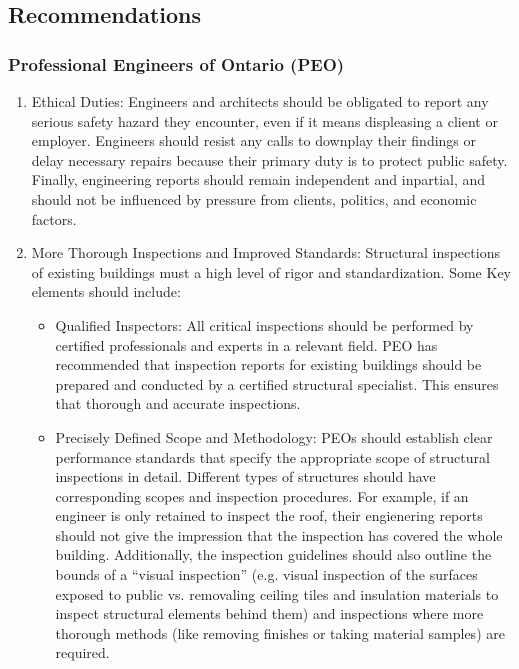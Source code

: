 \documentclass[12pt]{article}
\begin{document}
\subsection{Recommendations}

\subsubsection{Professional Engineers of Ontario (PEO)}
\begin{enumerate}
    \item Ethical Duties: Engineers and architects should be obligated to report any serious safety hazard they encounter, even if it means displeasing a client or employer. Engineers should resist any calls to downplay their findings or delay necessary repairs because their primary duty is to protect public safety. Finally, engineering reports should remain independent and inpartial, and should not be influenced by pressure from clients, politics, and economic factors.
    
    \item More Thorough Inspections and Improved Standards: Structural inspections of existing buildings must a high level of rigor and standardization. Some Key elements should include:
    
    \begin{itemize}
        \item Qualified Inspectors: All critical inspections should be performed by certified professionals and experts in a relevant field. PEO has recommended that inspection reports for existing buildings should be prepared and conducted by a certified structural specialist. This ensures that thorough and accurate inspections.
        
        \item Precisely Defined Scope and Methodology: PEOs should establish clear performance standards that specify the appropriate scope of structural inspections in detail. Different types of structures should have corresponding scopes and inspection procedures. For example, if an engineer is only retained to inspect the roof, their engienering reports should not give the impression that the inspection has covered the whole building. Additionally, the inspection guidelines should also outline the bounds of a “visual inspection” (e.g. visual inspection of the surfaces exposed to public vs. removaling ceiling tiles and insulation materials to inspect structural elements behind them) and inspections where more thorough methods (like removing finishes or taking material samples) are required.


\end{itemize}
\end{enumerate}
\end{document}
